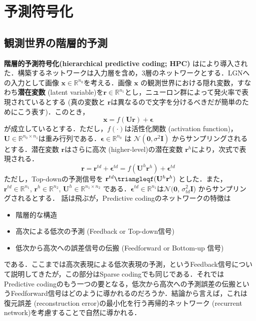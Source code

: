\section{予測符号化}
\subsection{観測世界の階層的予測}
\textbf{階層的予測符号化(hierarchical predictive coding; HPC)} は\citep{Rao1999-zv}により導入された．構築するネットワークは入力層を含め，3層のネットワークとする．LGNへの入力として画像 $\mathbf{x} \in \mathbb{R}^{n_0}$を考える．画像 $\mathbf{x}$ の観測世界における隠れ変数，すなわち\textbf{潜在変数} (latent variable)を$\mathbf{r} \in \mathbb{R}^{n_1}$とし，ニューロン群によって発火率で表現されているとする (真の変数と $\mathbf{r}$は異なるので文字を分けるべきだが簡単のためにこう表す)．このとき，
\begin{equation}
\mathbf{x} = f(\mathbf{U}\mathbf{r}) + \boldsymbol{\epsilon}
\end{equation}
が成立しているとする．ただし，$f(\cdot)$は活性化関数 (activation function)，$\mathbf{U} \in \mathbb{R}^{n_0 \times n_1}$は重み行列である．$\boldsymbol{\epsilon} \in \mathbb{R}^{n_0}$ は $\mathcal{N}(\mathbf{0}, \sigma^2 \mathbf{I})$ からサンプリングされるとする．潜在変数 $\mathbf{r}$はさらに高次 (higher-level)の潜在変数 $\mathbf{r}^h$により，次式で表現される．
\begin{equation}
\mathbf{r} = \mathbf{r}^{td}+\boldsymbol{\epsilon}^{td}=f(\mathbf{U}^h \mathbf{r}^h)+\boldsymbol{\epsilon}^{td}
\end{equation}
ただし，Top-downの予測信号を $\mathbf{r}^{td}\triangleqf(\mathbf{U}^h \mathbf{r}^h)$ とした．また，$\mathbf{r}^{td} \in \mathbb{R}^{n_1}$, $\mathbf{r}^{h} \in \mathbb{R}^{n_2}$, $\mathbf{U}^h \in \mathbb{R}^{n_1 \times n_2}$ である．$\boldsymbol{\epsilon}^{td} \in \mathbb{R}^{n_1}$は$\mathcal{N}(\mathbf{0}$, $\sigma_{td}^2 \mathbf{I}$) からサンプリングされるとする．
話は飛ぶが，Predictive codingのネットワークの特徴は
\begin{itemize}
\item 階層的な構造
\item 高次による低次の予測 (Feedback or Top-down信号)
\item 低次から高次への誤差信号の伝搬 (Feedforward or Bottom-up 信号)
\end{itemize}
である．ここまでは高次表現による低次表現の予測，というFeedback信号について説明してきたが，この部分はSparse codingでも同じである．それではPredictive codingのもう一つの要となる，低次から高次への予測誤差の伝搬というFeedforward信号はどのように導かれるのだろうか．結論から言えば，これは復元誤差 (reconstruction error)の最小化を行う再帰的ネットワーク (recurrent network)を考慮することで自然に導かれる．
